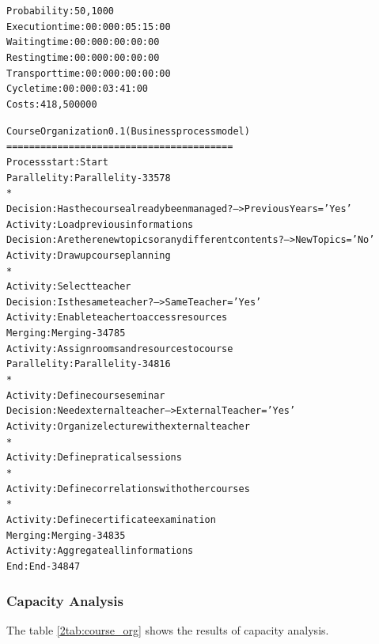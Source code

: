 \begin{alltt}
Probability:   50,1000%
Execution time:  00:000:05:15:00
Waiting time:  00:000:00:00:00
Resting time:  00:000:00:00:00
Transport time:  00:000:00:00:00
Cycle time:  00:000:03:41:00
Costs:  418,500000

Course Organization 0.1 (Business process model)
========================================
Process start: Start
Parallelity: Parallelity-33578
    *
    Decision: Has the course already been managed? --> PreviousYears = 'Yes'
    Activity: Load previous informations
    Decision: Are there new topics or any different contents? --> NewTopics = 'No'
    Activity: Draw up course planning
    *
    Activity: Select teacher
    Decision: Is the same teacher? --> SameTeacher = 'Yes'
    Activity: Enable teacher to access resources
Merging: Merging-34785
Activity: Assign rooms and resources to course
Parallelity: Parallelity-34816
    *
    Activity: Define course seminar
    Decision: Need external teacher --> ExternalTeacher = 'Yes'
    Activity: Organize lecture with external teacher
    *
    Activity: Define pratical sessions
    *
    Activity: Define correlations with other courses
    *
    Activity: Define certificate examination
Merging: Merging-34835
Activity: Aggregate all informations
End: End-34847
\end{alltt}

\subsubsection{Capacity Analysis}
The table \ref{2tab:course_org} shows the results of capacity analysis.


